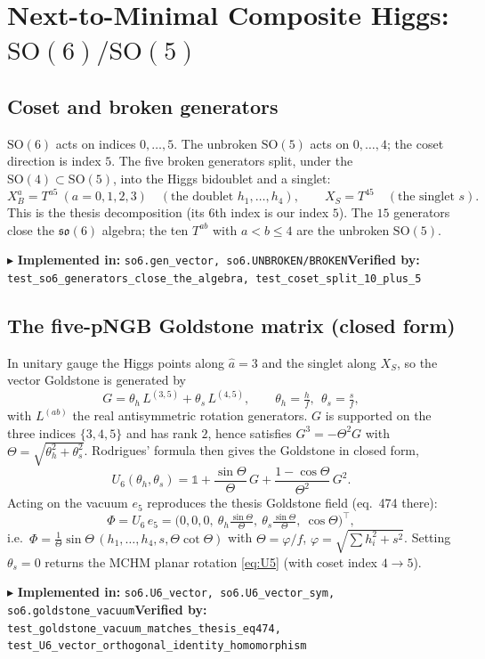 \documentclass[11pt]{article}
\newcommand{\so}[1]{\mathfrak{so}(#1)}
\newcommand{\SO}[1]{\mathrm{SO}(#1)}
\newcommand{\code}[1]{\texttt{#1}}
\newcommand{\impl}[2]{\par\smallskip\noindent\textcolor{blue!60!black}{\small$\blacktriangleright$ \textbf{Implemented in:} \code{#1}\quad\textbf{Verified by:} \code{#2}}\par\smallskip}
\begin{document}
\section{Next-to-Minimal Composite Higgs: \texorpdfstring{$\SO6/\SO5$}{SO(6)/SO(5)}}
\label{sec:nmchm}

\subsection{Coset and broken generators}
$\SO6$ acts on indices $0,\dots,5$. The unbroken $\SO5$ acts on $0,\dots,4$; the coset direction is
index $5$. The five broken generators split, under the $\SO4\subset\SO5$, into the Higgs bidoublet
and a singlet:
\begin{equation}
  X_B^{a}=T^{a5}\ (a=0,1,2,3)\quad(\text{the doublet }h_1,\dots,h_4),
  \qquad X_S=T^{45}\quad(\text{the singlet }s).
\end{equation}
This is the thesis decomposition (its 6th index is our index $5$). The $15$ generators close the
$\so6$ algebra; the ten $T^{ab}$ with $a<b\le 4$ are the unbroken $\SO5$.
\impl{so6.gen\_vector, so6.UNBROKEN/BROKEN}{test\_so6\_generators\_close\_the\_algebra, test\_coset\_split\_10\_plus\_5}

\subsection{The five-pNGB Goldstone matrix (closed form)}
In unitary gauge the Higgs points along $\hat a=3$ and the singlet along $X_S$, so the vector
Goldstone is generated by
\begin{equation}
  G=\theta_h\,L^{(3,5)}+\theta_s\,L^{(4,5)},\qquad
  \theta_h=\tfrac{h}{f},\ \ \theta_s=\tfrac{s}{f},
\end{equation}
with $L^{(ab)}$ the real antisymmetric rotation generators. $G$ is supported on the three indices
$\{3,4,5\}$ and has rank $2$, hence satisfies $G^3=-\Theta^2 G$ with
$\Theta=\sqrt{\theta_h^2+\theta_s^2}$. Rodrigues' formula then gives the Goldstone in closed form,
\begin{equation}
  U_6(\theta_h,\theta_s)=\mathbb 1+\frac{\sin\Theta}{\Theta}\,G+\frac{1-\cos\Theta}{\Theta^2}\,G^2 .
  \label{eq:U6}
\end{equation}
Acting on the vacuum $e_5$ reproduces the thesis Goldstone field (eq.~474 there):
\begin{equation}
  \Phi=U_6\,e_5=\Big(0,0,0,\ \theta_h\tfrac{\sin\Theta}{\Theta},\ \theta_s\tfrac{\sin\Theta}{\Theta},\ \cos\Theta\Big)^{\!\top},
\end{equation}
i.e.\ $\Phi=\frac{1}{\Theta}\sin\Theta\,(h_1,\dots,h_4,s,\Theta\cot\Theta)$ with
$\Theta=\varphi/f$, $\varphi=\sqrt{\sum h_i^2+s^2}$. Setting $\theta_s=0$ returns the MCHM planar
rotation \eqref{eq:U5} (with coset index $4\to5$).
\impl{so6.U6\_vector, so6.U6\_vector\_sym, so6.goldstone\_vacuum}{test\_goldstone\_vacuum\_matches\_thesis\_eq474, test\_U6\_vector\_orthogonal\_identity\_homomorphism}
\end{document}
